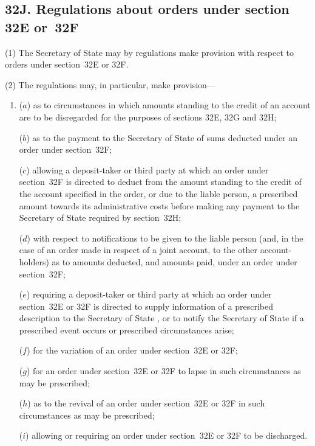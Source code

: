 \documentclass[12pt,a4paper]{article}
\begin{document}

\subsection{32J. Regulations about orders under section 32E or~32F}

(1) The Secretary of State may by regulations make provision with respect to orders under section~32E or 32F.

(2) The regulations may, in particular, make provision---
\begin{enumerate}\item[]
($a$) as to circumstances in which amounts standing to the credit of an account are to be disregarded for the purposes of sections 32E, 32G and 32H;

($b$) as to the payment to the 
Secretary of State  %
of sums deducted under an order under section~32F;

($c$) allowing a deposit-taker or third party at which an order under section~32F is directed to deduct from the amount standing to the credit of the account specified in the order, or due to the liable person, a prescribed amount towards its administrative costs before making any payment to the 
Secretary of State  %
required by section~32H;

($d$) with respect to notifications to be given to the liable person (and, in the case of an order made in respect of a joint account, to the other account-holders) as to amounts deducted, and amounts paid, under an order under section~32F;

($e$) requiring a deposit-taker or third party at which an order under section~32E or 32F is directed to supply information of a prescribed description to the 
Secretary of State%
, or to notify the 
Secretary of State  %
if a prescribed event occurs or prescribed circumstances arise;

($f$) for the variation of an order under section~32E or 32F;

($g$) for an order under section~32E or 32F to lapse in such circumstances as may be prescribed;

($h$) as to the revival of an order under section~32E or 32F in such circumstances as may be prescribed;

($i$) allowing or requiring an order under section~32E or 32F to be discharged.
\end{enumerate}
\end{document}
